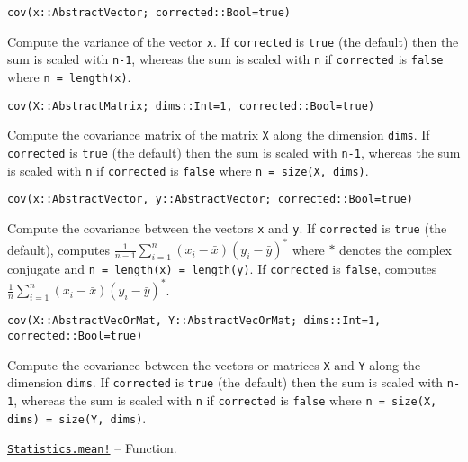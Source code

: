 \begin{adjustwidth}{2em}{0pt}


\begin{verbatim}
cov(x::AbstractVector; corrected::Bool=true)
\end{verbatim}

Compute the variance of the vector \texttt{x}. If \texttt{corrected} is \texttt{true} (the default) then the sum is scaled with \texttt{n-1}, whereas the sum is scaled with \texttt{n} if \texttt{corrected} is \texttt{false} where \texttt{n = length(x)}.




\begin{lstlisting}
cov(X::AbstractMatrix; dims::Int=1, corrected::Bool=true)
\end{lstlisting}

Compute the covariance matrix of the matrix \texttt{X} along the dimension \texttt{dims}. If \texttt{corrected} is \texttt{true} (the default) then the sum is scaled with \texttt{n-1}, whereas the sum is scaled with \texttt{n} if \texttt{corrected} is \texttt{false} where \texttt{n = size(X, dims)}.




\begin{lstlisting}
cov(x::AbstractVector, y::AbstractVector; corrected::Bool=true)
\end{lstlisting}

Compute the covariance between the vectors \texttt{x} and \texttt{y}. If \texttt{corrected} is \texttt{true} (the default), computes \(\frac{1}{n-1}\sum_{i=1}^n (x_i-\bar x) (y_i-\bar y)^*\) where \(*\) denotes the complex conjugate and \texttt{n = length(x) = length(y)}. If \texttt{corrected} is \texttt{false}, computes \(\frac{1}{n}\sum_{i=1}^n (x_i-\bar x) (y_i-\bar y)^*\).




\begin{lstlisting}
cov(X::AbstractVecOrMat, Y::AbstractVecOrMat; dims::Int=1, corrected::Bool=true)
\end{lstlisting}

Compute the covariance between the vectors or matrices \texttt{X} and \texttt{Y} along the dimension \texttt{dims}. If \texttt{corrected} is \texttt{true} (the default) then the sum is scaled with \texttt{n-1}, whereas the sum is scaled with \texttt{n} if \texttt{corrected} is \texttt{false} where \texttt{n = size(X, dims) = size(Y, dims)}.



\end{adjustwidth}
\hypertarget{9852865620009351869}{} 
\hyperlink{9852865620009351869}{\texttt{Statistics.mean!}}  -- {Function.}

